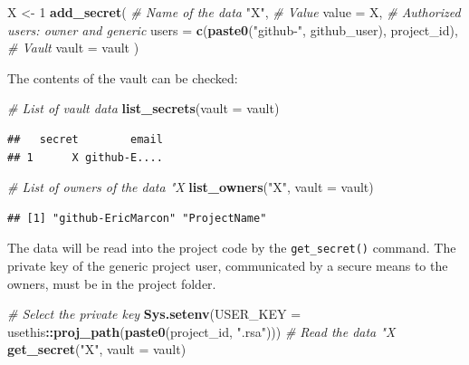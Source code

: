 \documentclass[
  12pt,
  american,
  a4paper,
  extrafontsizes,onecolumn,openright
  ]{memoir}
\newenvironment{Shaded}{\begin{snugshade}}{\end{snugshade}}
\newcommand{\AttributeTok}[1]{\textcolor[rgb]{0.13,0.29,0.53}{#1}}
\newcommand{\CommentTok}[1]{\textcolor[rgb]{0.56,0.35,0.01}{\textit{#1}}}
\newcommand{\DecValTok}[1]{\textcolor[rgb]{0.00,0.00,0.81}{#1}}
\newcommand{\FunctionTok}[1]{\textcolor[rgb]{0.13,0.29,0.53}{\textbf{#1}}}
\newcommand{\NormalTok}[1]{#1}
\newcommand{\OtherTok}[1]{\textcolor[rgb]{0.56,0.35,0.01}{#1}}
\newcommand{\SpecialCharTok}[1]{\textcolor[rgb]{0.81,0.36,0.00}{\textbf{#1}}}
\newcommand{\StringTok}[1]{\textcolor[rgb]{0.31,0.60,0.02}{#1}}
\begin{document}
\scriptsize

\begin{Shaded}
\begin{Highlighting}[]
\NormalTok{X }\OtherTok{\textless{}{-}} \DecValTok{1}
\FunctionTok{add\_secret}\NormalTok{(}
  \CommentTok{\# Name of the data}
  \StringTok{"X"}\NormalTok{, }
  \CommentTok{\# Value}
  \AttributeTok{value =}\NormalTok{ X, }
  \CommentTok{\# Authorized users: owner and generic}
  \AttributeTok{users =} \FunctionTok{c}\NormalTok{(}\FunctionTok{paste0}\NormalTok{(}\StringTok{"github{-}"}\NormalTok{, github\_user), project\_id), }
  \CommentTok{\# Vault}
  \AttributeTok{vault =}\NormalTok{ vault}
\NormalTok{)}
\end{Highlighting}
\end{Shaded}

\normalsize

The contents of the vault can be checked:

\scriptsize

\begin{Shaded}
\begin{Highlighting}[]
\CommentTok{\# List of vault data}
\FunctionTok{list\_secrets}\NormalTok{(}\AttributeTok{vault =}\NormalTok{ vault)}
\end{Highlighting}
\end{Shaded}

\begin{verbatim}
##   secret        email
## 1      X github-E....
\end{verbatim}

\begin{Shaded}
\begin{Highlighting}[]
\CommentTok{\# List of owners of the data "X}
\FunctionTok{list\_owners}\NormalTok{(}\StringTok{"X"}\NormalTok{, }\AttributeTok{vault =}\NormalTok{ vault)}
\end{Highlighting}
\end{Shaded}

\begin{verbatim}
## [1] "github-EricMarcon" "ProjectName"
\end{verbatim}

\normalsize

The data will be read into the project code by the \texttt{get\_secret()} command.
The private key of the generic project user, communicated by a secure means to the owners, must be in the project folder.

\scriptsize

\begin{Shaded}
\begin{Highlighting}[]
\CommentTok{\# Select the private key}
\FunctionTok{Sys.setenv}\NormalTok{(}\AttributeTok{USER\_KEY =}\NormalTok{ usethis}\SpecialCharTok{::}\FunctionTok{proj\_path}\NormalTok{(}\FunctionTok{paste0}\NormalTok{(project\_id, }\StringTok{".rsa"}\NormalTok{)))}
\CommentTok{\# Read the data "X}
\FunctionTok{get\_secret}\NormalTok{(}\StringTok{"X"}\NormalTok{, }\AttributeTok{vault =}\NormalTok{ vault)}
\end{Highlighting}
\end{Shaded}
\end{document}
